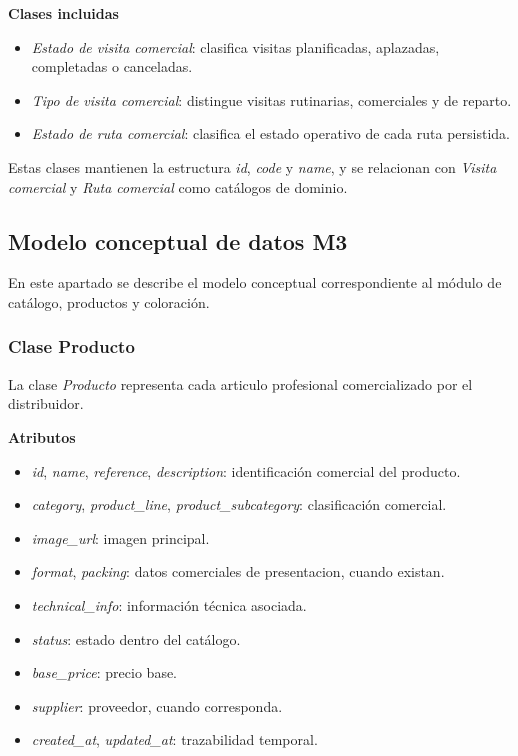 \textbf{Clases incluidas}

\begin{itemize}
      \item \textit{Estado de visita comercial}: clasifica visitas planificadas, aplazadas, completadas o canceladas.
      \item \textit{Tipo de visita comercial}: distingue visitas rutinarias, comerciales y de reparto.
      \item \textit{Estado de ruta comercial}: clasifica el estado operativo de cada ruta persistida.
\end{itemize}

Estas clases mantienen la estructura \textit{id}, \textit{code} y \textit{name}, y se relacionan con \textit{Visita comercial} y \textit{Ruta comercial} como catálogos de dominio.

\subsection{Modelo conceptual de datos M3}

En este apartado se describe el modelo conceptual correspondiente al módulo de catálogo, productos y coloración.

\subsubsection{Clase Producto}

La clase \textit{Producto} representa cada articulo profesional comercializado por el distribuidor.

\textbf{Atributos}

\begin{itemize}
      \item \textit{id}, \textit{name}, \textit{reference}, \textit{description}: identificación comercial del producto.
      \item \textit{category}, \textit{product\_line}, \textit{product\_subcategory}: clasificación comercial.
      \item \textit{image\_url}: imagen principal.
      \item \textit{format}, \textit{packing}: datos comerciales de presentacion, cuando existan.
      \item \textit{technical\_info}: información técnica asociada.
      \item \textit{status}: estado dentro del catálogo.
      \item \textit{base\_price}: precio base.
      \item \textit{supplier}: proveedor, cuando corresponda.
      \item \textit{created\_at}, \textit{updated\_at}: trazabilidad temporal.
\end{itemize}

